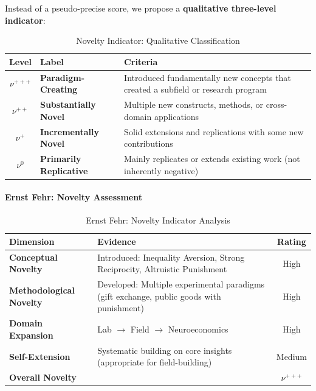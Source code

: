 \documentclass[11pt,a4paper]{article}
\begin{document}
Instead of a pseudo-precise score, we propose a \textbf{qualitative three-level indicator}:

\begin{table}[h]
\centering
\caption{Novelty Indicator: Qualitative Classification}
\begin{tabular}{clp{6cm}}
\toprule
\textbf{Level} & \textbf{Label} & \textbf{Criteria} \\
\midrule
$\nu^{+++}$ & \textbf{Paradigm-Creating} & Introduced fundamentally new concepts that created a subfield or research program \\
\addlinespace
$\nu^{++}$ & \textbf{Substantially Novel} & Multiple new constructs, methods, or cross-domain applications \\
\addlinespace
$\nu^{+}$ & \textbf{Incrementally Novel} & Solid extensions and replications with some new contributions \\
\addlinespace
$\nu^{0}$ & \textbf{Primarily Replicative} & Mainly replicates or extends existing work (not inherently negative) \\
\bottomrule
\end{tabular}
\end{table}

\paragraph{Ernst Fehr: Novelty Assessment}

\begin{table}[h]
\centering
\caption{Ernst Fehr: Novelty Indicator Analysis}
\begin{tabular}{p{3.5cm}p{5cm}c}
\toprule
\textbf{Dimension} & \textbf{Evidence} & \textbf{Rating} \\
\midrule
\textbf{Conceptual Novelty} & Introduced: Inequality Aversion, Strong Reciprocity, Altruistic Punishment & High \\
\addlinespace
\textbf{Methodological Novelty} & Developed: Multiple experimental paradigms (gift exchange, public goods with punishment) & High \\
\addlinespace
\textbf{Domain Expansion} & Lab $\to$ Field $\to$ Neuroeconomics & High \\
\addlinespace
\textbf{Self-Extension} & Systematic building on core insights (appropriate for field-building) & Medium \\
\midrule
\textbf{Overall Novelty} & & $\nu^{+++}$ \\
\bottomrule
\end{tabular}
\end{table}
\end{document}

